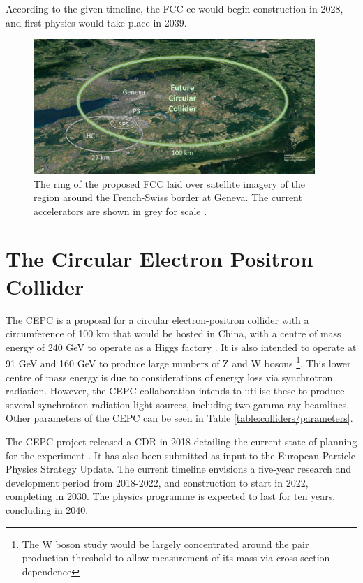 According to the given timeline, the FCC-ee would begin construction in 2028, and first physics would take place in 2039. 

\begin{figure}[t]
	\centering
	\includegraphics[width=0.95\textwidth]{../Pictures/FCC-Scale.jpg}
	\caption{The ring of the proposed \acrlong{FCC} laid over satellite imagery of the region around the French-Swiss border at Geneva. The current accelerators are shown in grey for scale \cite{fcc-schematic}.}
	\label{figure:colliders/FCC/scale}
\end{figure}

\section{The Circular Electron Positron Collider}
The \acrfull{CEPC} is a proposal for a circular electron-positron collider with a circumference of 100 km that would be hosted in China, with a centre of mass energy of 240 GeV to operate as a Higgs factory \cite{cepc-cdr-accelerator}. It is also intended to operate at 91 GeV and 160 GeV to produce large numbers of Z and W bosons  \footnote{The W boson study would be largely concentrated around the pair production threshold to allow measurement of its mass via cross-section dependence}. This lower centre of mass energy is due to considerations of energy loss via synchrotron radiation. However, the \acrshort{CEPC} collaboration intends to utilise these to produce several synchrotron radiation light sources, including two gamma-ray beamlines. Other parameters of the \acrshort{CEPC} can be seen in Table \ref{table:colliders/parameters}.

The \acrshort{CEPC} project released a \acrfull{CDR} in 2018 detailing the current state of planning for the experiment \cite{cepc-cdr-accelerator}. It has also been submitted as input to the European Particle Physics Strategy Update. The current timeline envisions a five-year research and development period from 2018-2022, and construction to start in 2022, completing in 2030. The physics programme is expected to last for ten years, concluding in 2040. 

